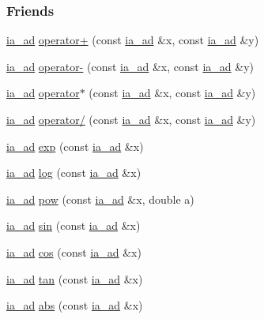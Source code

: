 \subsubsection*{\-Friends}
\begin{DoxyCompactItemize}
\item 
\hyperlink{classia__ad}{ia\-\_\-ad} \hyperlink{classia__ad_ad68a7532f5ca0c7f1b18dece66a4f777}{operator+} (const \hyperlink{classia__ad}{ia\-\_\-ad} \&x, const \hyperlink{classia__ad}{ia\-\_\-ad} \&y)
\item 
\hyperlink{classia__ad}{ia\-\_\-ad} \hyperlink{classia__ad_a3f6139c06ee4de92fa9f7e9eb3799822}{operator-\/} (const \hyperlink{classia__ad}{ia\-\_\-ad} \&x, const \hyperlink{classia__ad}{ia\-\_\-ad} \&y)
\item 
\hyperlink{classia__ad}{ia\-\_\-ad} \hyperlink{classia__ad_ac9dbbd5ed38dfd24d0d3383e70e06757}{operator$\ast$} (const \hyperlink{classia__ad}{ia\-\_\-ad} \&x, const \hyperlink{classia__ad}{ia\-\_\-ad} \&y)
\item 
\hyperlink{classia__ad}{ia\-\_\-ad} \hyperlink{classia__ad_a207e53a1adea5e2e228ea9aac2e987ce}{operator/} (const \hyperlink{classia__ad}{ia\-\_\-ad} \&x, const \hyperlink{classia__ad}{ia\-\_\-ad} \&y)
\item 
\hyperlink{classia__ad}{ia\-\_\-ad} \hyperlink{classia__ad_ab10628c14d8e3bcbfd5a9c20a3c4b7a3}{exp} (const \hyperlink{classia__ad}{ia\-\_\-ad} \&x)
\item 
\hyperlink{classia__ad}{ia\-\_\-ad} \hyperlink{classia__ad_a6e263596eb34ae16adbd500a5cd82529}{log} (const \hyperlink{classia__ad}{ia\-\_\-ad} \&x)
\item 
\hyperlink{classia__ad}{ia\-\_\-ad} \hyperlink{classia__ad_acbce4ef433fe28e1beebd11bfa2a4943}{pow} (const \hyperlink{classia__ad}{ia\-\_\-ad} \&x, double a)
\item 
\hyperlink{classia__ad}{ia\-\_\-ad} \hyperlink{classia__ad_ad6b0424c199b324dceb7e39c30cfcfde}{sin} (const \hyperlink{classia__ad}{ia\-\_\-ad} \&x)
\item 
\hyperlink{classia__ad}{ia\-\_\-ad} \hyperlink{classia__ad_ae372d97f35653bbae447fd0449f546bf}{cos} (const \hyperlink{classia__ad}{ia\-\_\-ad} \&x)
\item 
\hyperlink{classia__ad}{ia\-\_\-ad} \hyperlink{classia__ad_abbbdc596e760bd5bedbf704c4b1309b4}{tan} (const \hyperlink{classia__ad}{ia\-\_\-ad} \&x)
\item 
\hyperlink{classia__ad}{ia\-\_\-ad} \hyperlink{classia__ad_a0ad1570ac355e3b9e59b6a8f1c199087}{abs} (const \hyperlink{classia__ad}{ia\-\_\-ad} \&x)

\end{DoxyCompactItemize}
